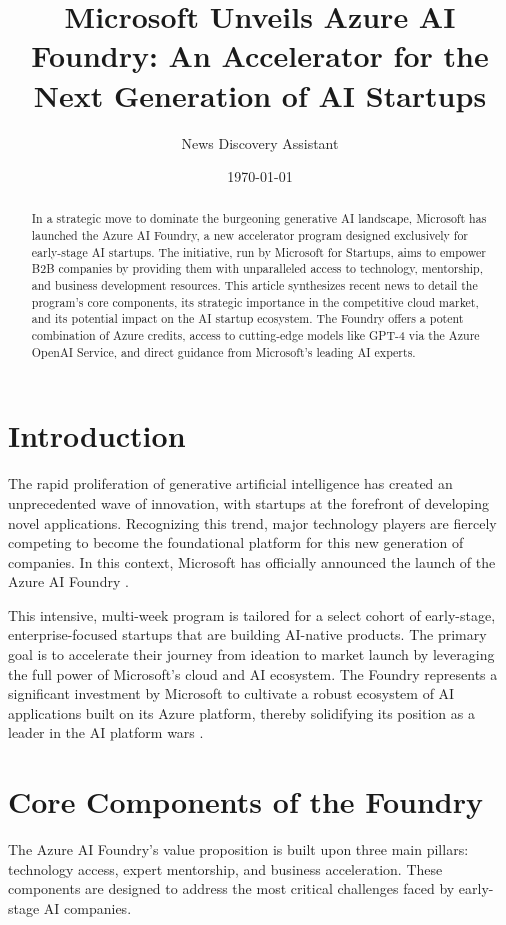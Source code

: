 \documentclass[11pt, a4paper]{article}
\title{\textbf{Microsoft Unveils Azure AI Foundry: An Accelerator for the Next Generation of AI Startups}}
\author{News Discovery Assistant}
\date{\today}
\begin{document}
\maketitle

\begin{abstract}
In a strategic move to dominate the burgeoning generative AI landscape, Microsoft has launched the Azure AI Foundry, a new accelerator program designed exclusively for early-stage AI startups. The initiative, run by Microsoft for Startups, aims to empower B2B companies by providing them with unparalleled access to technology, mentorship, and business development resources. This article synthesizes recent news to detail the program's core components, its strategic importance in the competitive cloud market, and its potential impact on the AI startup ecosystem. The Foundry offers a potent combination of Azure credits, access to cutting-edge models like GPT-4 via the Azure OpenAI Service, and direct guidance from Microsoft's leading AI experts.
\end{abstract}

\section{Introduction}
The rapid proliferation of generative artificial intelligence has created an unprecedented wave of innovation, with startups at the forefront of developing novel applications. Recognizing this trend, major technology players are fiercely competing to become the foundational platform for this new generation of companies. In this context, Microsoft has officially announced the launch of the Azure AI Foundry \cite{msft_blog}.

This intensive, multi-week program is tailored for a select cohort of early-stage, enterprise-focused startups that are building AI-native products. The primary goal is to accelerate their journey from ideation to market launch by leveraging the full power of Microsoft's cloud and AI ecosystem. The Foundry represents a significant investment by Microsoft to cultivate a robust ecosystem of AI applications built on its Azure platform, thereby solidifying its position as a leader in the AI platform wars \cite{techcrunch_report}.

\section{Core Components of the Foundry}
The Azure AI Foundry's value proposition is built upon three main pillars: technology access, expert mentorship, and business acceleration. These components are designed to address the most critical challenges faced by early-stage AI companies.
\end{document}

